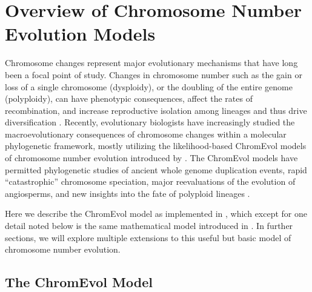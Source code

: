 \section{Overview of Chromosome Number Evolution Models} \label{sec:chromo_basic_intro}


Chromosome changes
represent major evolutionary mechanisms that have long been a focal point of study.
Changes in chromosome number such as the gain or loss of a single
chromosome (dysploidy), or the doubling of the entire genome (polyploidy),
can have phenotypic consequences,
affect the rates of recombination,
and increase reproductive isolation among lineages and thus drive diversification \citep{stebbins1971chromosomal}.
Recently, evolutionary biologists have increasingly studied the macroevolutionary
consequences of chromosome changes within a molecular phylogenetic framework,
mostly utilizing the likelihood-based ChromEvol models of chromosome number evolution
introduced by \citet{mayrose2010probabilistic}.
The ChromEvol models have permitted phylogenetic studies
of ancient whole genome duplication events,
rapid ``catastrophic'' chromosome speciation,
major reevaluations of the evolution of angiosperms,
and new insights into the fate of polyploid lineages \citep[e.g.][]{pires2008renaissance, mayrose2011recently, tank2015nested}.


Here we describe the ChromEvol model as implemented in \RevBayes,
which except for one detail noted below 
is the same mathematical model introduced in \citet{mayrose2010probabilistic}.
In further sections, we will explore multiple extensions to this useful but basic model of chromosome number evolution.


\subsection{The ChromEvol Model}


